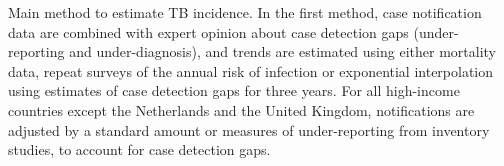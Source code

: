 \label{fig:incmethods}Main method to estimate TB incidence. In the first method, case notification data are combined with expert opinion about case detection gaps (under-reporting and under-diagnosis), and trends are estimated using either mortality data, repeat surveys of the annual risk of infection or exponential interpolation using estimates of case detection gaps for three years. For all high-income countries except the Netherlands and the United Kingdom, notifications are adjusted by a standard amount or measures of under-reporting from inventory studies, to account for case detection gaps. 